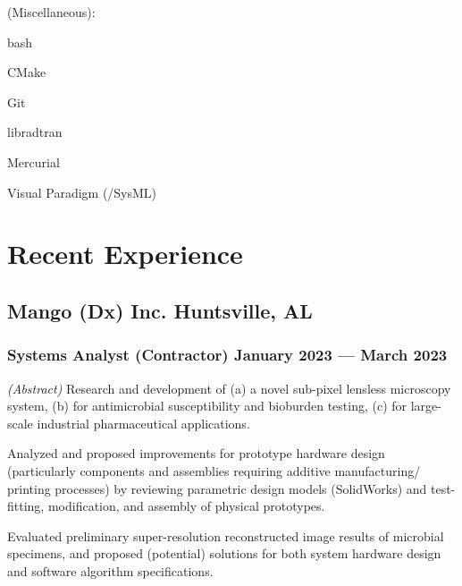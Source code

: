 \documentclass[letterpaper, oneside, 10pt]{article}
\begin{document}
\begin{multicols}{2}
{  {\jostmedium (Miscellaneous):}%
    \begin{itemize*}[%
      label=\relax, labelwidth=0pt, itemjoin=\space\char"00B7%
    ]%
      \item bash%
      \item CMake%
      \item {}%
      \item Git%
      \item {}%
      \item libradtran%
      \item Mercurial%
      \item {}%
      \item Visual Paradigm (/SysML)%
    \end{itemize*}
  }
\end{multicols}

\section*{Recent Experience} %

\hfill
\vspace{-24pt}

\subsection*{Mango (Dx) Inc.\DotSep{0.25em} Huntsville, AL}
\subsubsection*{%
  Systems Analyst (Contractor)\DotSep{0.25em} January 2023 --- March 2023
}

\textit{(Abstract)}\DotSep{0.25em} Research and development of (a) a novel
sub-pixel lensless microscopy system, (b) for antimicrobial susceptibility and
bioburden testing, (c) for large-scale industrial pharmaceutical applications.

Analyzed and proposed improvements for prototype hardware design (particularly
components and assemblies requiring additive manufacturing/ printing
processes) by reviewing parametric design models (SolidWorks) and test-fitting,
modification, and assembly of physical prototypes.

Evaluated preliminary super-resolution reconstructed image results of microbial
specimens, and proposed (potential) solutions for both system hardware design
and software algorithm specifications.
\end{document}
